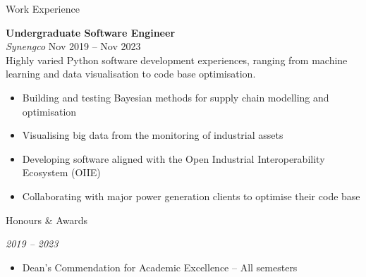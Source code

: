 \documentclass{custom-resume}
\begin{document}
\begin{minipage}[t][21.5cm]{\rightouterwidth}


  \raggedright

  \vspace{6pt} %


  \begin{section}{Work Experience}

    \textbf{Undergraduate Software Engineer} \\[8pt]

    \textit{Synengco} \hfill Nov 2019 -- Nov 2023 \\[8pt]

    Highly varied Python software development experiences, ranging from machine learning and data visualisation to code base optimisation.

    \begin{itemize}
      \item Building and testing Bayesian methods for supply chain modelling and optimisation
      \item Visualising big data from the monitoring of industrial assets
      \item Developing software aligned with the Open Industrial Interoperability Ecosystem (OIIE)
      \item Collaborating with major power generation clients to optimise their code base
    \end{itemize}

  \end{section}


  \begin{section*}{Honours \& Awards}

    \textit{2019 -- 2023}
    \begin{itemize}
      \item Dean's Commendation for Academic Excellence – All semesters
    \end{itemize}
    \vspace{8pt}


\end{section*}
\end{minipage}
\end{document}
